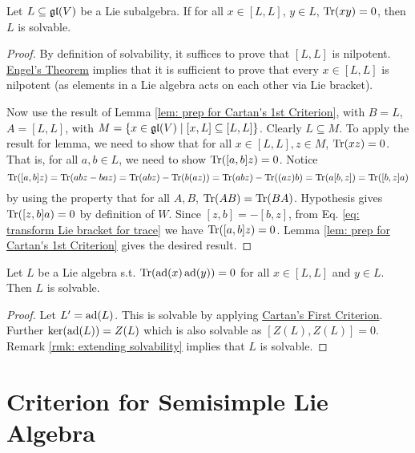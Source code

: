 \documentclass{article}
\begin{document}
\begin{theorem}\label{thm: Cartan's First Criterion}
    Let $L \subseteq \mathfrak{gl}(V)$ be a Lie subalgebra. If for all $x \in [L, L]$, $y \in L$, $\operatorname{Tr}(xy) = 0$, then $L$ is solvable.
\end{theorem}

\begin{proof}
    By definition of solvability, it suffices to prove that $[L, L]$ is nilpotent. \hyperref[thm: Engel]{Engel's Theorem} implies that it is sufficient to prove that every $x \in [L, L]$ is nilpotent (as elements in a Lie algebra acts on each other via Lie bracket).

    Now use the result of Lemma \ref{lem: prep for Cartan's 1st Criterion}, with $B = L$, $A = [L, L]$, with $M = \{ x \in \mathfrak{gl}(V) \mid [x, L] \subseteq [L, L] \}$. Clearly $L \subseteq M$. To apply the result for lemma, we need to show that for all $x \in [L, L], z \in M$, $\operatorname{Tr}(xz) = 0$. That is, for all $a, b \in L$, we need to show $\operatorname{Tr}([a, b] z) = 0$. Notice
    \begin{equation}\label{eq: transform Lie bracket for trace}
        \operatorname{Tr}([a, b]z) = \operatorname{Tr}(abz - baz) = \operatorname{Tr}(abz) - \operatorname{Tr}(b(az)) = \operatorname{Tr}(abz) - \operatorname{Tr}((az)b) = \operatorname{Tr}(a[b, z]) = \operatorname{Tr}([b, z]a)
    \end{equation}
    by using the property that for all $A, B$, $\operatorname{Tr}(AB) = \operatorname{Tr}(BA)$. Hypothesis gives $\operatorname{Tr}([z, b]a) = 0$ by definition of $W$. Since $[z, b] = -[b, z]$, from Eq. \eqref{eq: transform Lie bracket for trace} we have $\operatorname{Tr}([a, b]z) = 0$. Lemma \ref{lem: prep for Cartan's 1st Criterion} gives the desired result.
\end{proof}

\begin{corollary}\label{cor: corollary of Cartan's First Criterion to ad}
    Let $L$ be a Lie algebra s.t. $\operatorname{Tr}(\operatorname{ad}(x) \operatorname{ad}(y)) = 0$ for all $x \in [L, L]$ and $y \in L$. Then $L$ is solvable.
\end{corollary}

\begin{proof}
    Let $L' = \operatorname{ad}(L)$. This is solvable by applying \hyperref[thm: Cartan's First Criterion]{Cartan's First Criterion}. Further $\ker (\operatorname{ad}(L)) = Z(L)$ which is also solvable as $[Z(L), Z(L)] = 0$. Remark \ref{rmk: extending solvability} implies that $L$ is solvable.
\end{proof}

\section{Criterion for Semisimple Lie Algebra}
\end{document}

